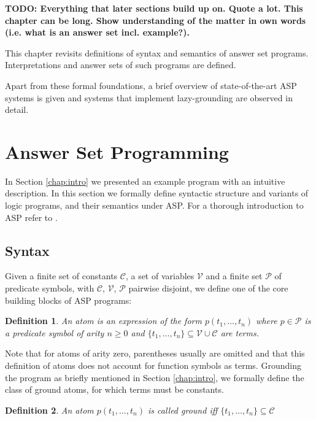 \documentclass{vutinfth} %
\newcommand{\todo}[1]{{\color{red}\textbf{TODO: {#1}}}} %
\newtheorem{definition}{Definition}[section]
\begin{document}
\todo{Everything that later sections build up on. Quote a lot. This chapter can be long. Show understanding of the matter in own words (i.e. what is an answer set incl. example?).}

This chapter revisits definitions of syntax and semantics of answer set programs. Interpretations and answer sets of such programs are defined.

Apart from these formal foundations, a brief overview of state-of-the-art ASP systems is given and systems that implement lazy-grounding are observed in detail.

\section{Answer Set Programming}

In Section \ref{chap:intro} we presented an example program with an intuitive description. In this section we formally define syntactic structure and variants of logic programs, and their semantics under ASP. For a thorough introduction to ASP refer to \cite{DBLP:conf/rweb/EiterIK09}.

\subsection{Syntax}


Given a finite set of constants $\mathcal{C}$, a set of variables $\mathcal{V}$ and a finite set $\mathcal{P}$ of predicate symbols, with $\mathcal{C}$, $\mathcal{V}$, $\mathcal{P}$ pairwise disjoint, we define one of the core building blocks of ASP programs:

\begin{definition}
An \emph{atom} is an expression of the form $p(t_1, \ldots , t_n)$ where $p \in \mathcal{P}$ is a predicate symbol of arity $n \geq 0$ and $\{ t_1, \ldots , t_n \} \subseteq \mathcal{V} \cup \mathcal{C}$ are terms.
\end{definition}

Note that for atoms of arity zero, parentheses usually are omitted and that this definition of atoms does not account for function symbols as terms. Grounding the program as briefly mentioned in Section \ref{chap:intro}, we formally define the class of ground atoms, for which terms must be constants.

\begin{definition}
An atom $p(t_1, \ldots , t_n)$ is called \emph{ground} iff $\{ t_1, \ldots , t_n \} \subseteq \mathcal{C}$
\end{definition}
\end{document}
